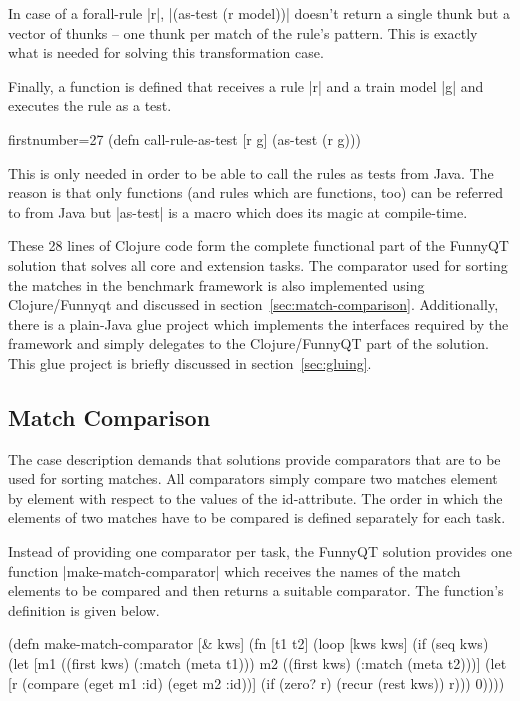 \documentclass[submission]{eptcs}
\newcommand{\code}{\clojureinline}
\begin{document}
In case of a forall-rule \code|r|, \code|(as-test (r model))| doesn't return a
single thunk but a vector of thunks -- one thunk per match of the rule's
pattern.  This is exactly what is needed for solving this transformation case.

Finally, a function is defined that receives a rule \code|r| and a train model
\code|g| and executes the rule as a test.

\begin{clojurecode*}{firstnumber=27}
(defn call-rule-as-test [r g]
  (as-test (r g)))
\end{clojurecode*}

This is only needed in order to be able to call the rules as tests from Java.
The reason is that only functions (and rules which are functions, too) can be
referred to from Java but \code|as-test| is a macro which does its magic at
compile-time.

These 28 lines of Clojure code form the complete functional part of the FunnyQT
solution that solves all core and extension tasks.  The comparator used for
sorting the matches in the benchmark framework is also implemented using
Clojure/Funnyqt and discussed in section~\vref{sec:match-comparison}.
Additionally, there is a plain-Java glue project which implements the
interfaces required by the framework and simply delegates to the
Clojure/FunnyQT part of the solution.  This glue project is briefly discussed
in section~\vref{sec:gluing}.


\subsection{Match Comparison}
\label{sec:match-comparison}

The case description demands that solutions provide comparators that are to be
used for sorting matches.  All comparators simply compare two matches element
by element with respect to the values of the \textsf{id}-attribute.  The order
in which the elements of two matches have to be compared is defined separately
for each task.

Instead of providing one comparator per task, the FunnyQT solution provides one
function \code|make-match-comparator| which receives the names of the match
elements to be compared and then returns a suitable comparator.  The function's
definition is given below.

\begin{clojurecode}
(defn make-match-comparator [& kws]
  (fn [t1 t2]
    (loop [kws kws]
      (if (seq kws)
        (let [m1 ((first kws) (:match (meta t1)))
              m2 ((first kws) (:match (meta t2)))]
          (let [r (compare (eget m1 :id) (eget m2 :id))]
            (if (zero? r)
              (recur (rest kws))
              r)))
        0))))
\end{clojurecode}
\end{document}
